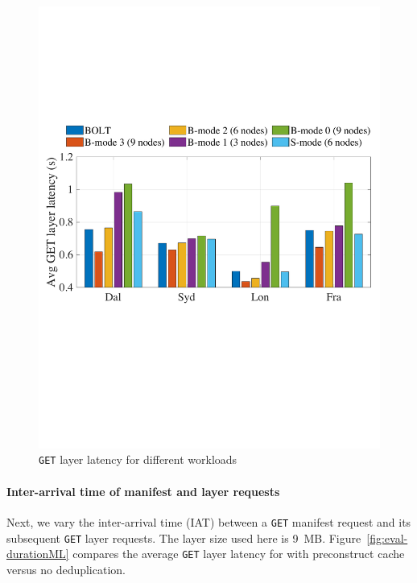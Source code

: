\begin{figure}[t]
\begin{minipage}{0.3\textwidth}
		\includegraphics[width=1.0\textwidth]{graphs/total-traces.pdf}
		\caption{\texttt{GET} layer latency for different workloads} %
		\label{fig:eval-total-traces}
	\end{minipage}
\end{figure}
 
\paragraph{Inter-arrival time of manifest and layer requests}
%
Next, we vary the inter-arrival time (IAT) between a \texttt{GET} manifest request and its
subsequent \texttt{GET} layer requests.
%
The layer size used here is 9~MB.
%
Figure~\ref{fig:eval-durationML} compares the average \texttt{GET} layer latency for
\sysname with preconstruct cache versus no deduplication.

